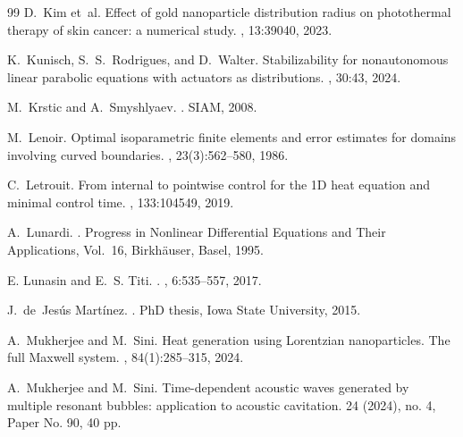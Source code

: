 \documentclass[11pt,a4paper]{article}
\numberwithin{equation}{section}
\theoremstyle{definition}
\newcommand{\1}{\mathbbm{1}}
\begin{document}
\begin{thebibliography}{99}
D.~Kim et~al.
\newblock Effect of gold nanoparticle distribution radius on photothermal therapy of skin cancer: a numerical study.
, 13:39040, 2023.

K.~Kunisch, S.~S.~Rodrigues, and D.~Walter.
\newblock Stabilizability for nonautonomous linear parabolic equations with actuators as distributions.
, 30:43, 2024.

M.~Krstic and A.~Smyshlyaev.
.
\newblock SIAM, 2008.

M.~Lenoir.
\newblock Optimal isoparametric finite elements and error estimates for domains involving curved boundaries.
, 23(3):562--580, 1986.

C.~Letrouit.
\newblock From internal to pointwise control for the 1{D} heat equation and minimal control time.
, 133:104549, 2019.


A.~Lunardi.
.
\newblock Progress in Nonlinear Differential Equations and Their Applications, Vol.~16, Birkh\"auser, Basel, 1995.

E. Lunasin and E.~S. Titi.
. , 6:535--557, 2017.

J.~de~Jes{\'u}s Mart{\'i}nez.
.
\newblock PhD thesis, Iowa State University, 2015.

A.~Mukherjee and M.~Sini.
\newblock Heat generation using Lorentzian nanoparticles. The full Maxwell system.
, 84(1):285--315, 2024.

A.~Mukherjee and M.~Sini.
\newblock Time-dependent acoustic waves generated by multiple resonant bubbles: application to acoustic cavitation.
 24 (2024), no. 4, Paper No. 90, 40 pp.


\end{thebibliography}
\end{document}
